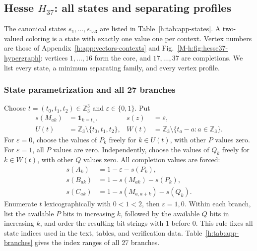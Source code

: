 \documentclass[aps,pra,reprint,superscriptaddress,longbibliography,nofootinbib,floatfix,10pt]{revtex4-2}
\theoremstyle{definition}
\newcommand{\Z}{\mathbb{Z}}
\begin{document}
\FloatBarrier
\subsection{\texorpdfstring{Hesse $H_{37}$: all states and separating profiles}{Hesse H37: all states and separating profiles}}\label{h:app:states}

The canonical states $s_1,\ldots,s_{153}$ are listed in Table~\ref{h:tab:app-states}. A two-valued coloring is a state with exactly one value one per context. Vertex numbers are those of Appendix~\ref{h:app:vectors-contexts} and Fig.~\ref{M-h:fig:hesse37-hypergraph}: vertices $1,\ldots,16$ form the core, and $17,\ldots,37$ are completions. We list every state, a minimum separating family, and every vertex profile.

\subsubsection{State parametrization and all 27 branches}\label{h:app:branches}

Choose $t=(t_0,t_1,t_2)\in\Z_3^3$ and $\varepsilon\in\{0,1\}$. Put
\begin{align}
s(M_{ak})&=\mathbf1_{k=t_a},&s(z)&=\varepsilon,\\
U(t)&=\Z_3\setminus\{t_0,t_1,t_2\},&
W(t)&=\Z_3\setminus\{t_a-a:a\in\Z_3\}.
\end{align}
For $\varepsilon=0$, choose the values of $P_k$ freely for $k\in U(t)$, with other $P$ values zero. For $\varepsilon=1$, all $P$ values are zero. Independently, choose the values of $Q_k$ freely for $k\in W(t)$, with other $Q$ values zero. All completion values are forced:
\begin{align}
s(A_k)&=1-\varepsilon-s(P_k),\\
s(B_{ak})&=1-s(M_{ak})-s(P_k),\\
s(C_{ak})&=1-s(M_{a,a+k})-s(Q_k).
\end{align}
Enumerate $t$ lexicographically with $0<1<2$, then $\varepsilon=1,0$. Within each branch, list the available $P$ bits in increasing $k$, followed by the available $Q$ bits in increasing $k$, and order the resulting bit strings with $1$ before $0$. This rule fixes all state indices used in the text, tables, and verification data. Table~\ref{h:tab:app-branches} gives the index ranges of all 27 branches.
\end{document}
